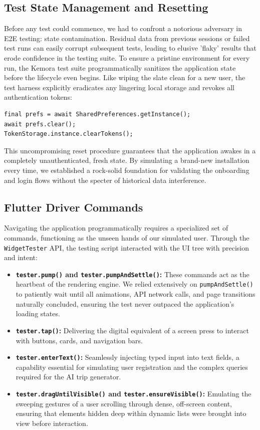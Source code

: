 \subsection{Test State Management and Resetting}
Before any test could commence, we had to confront a notorious adversary in E2E testing: state contamination. Residual data from previous sessions or failed test runs can easily corrupt subsequent tests, leading to elusive 'flaky' results that erode confidence in the testing suite. To ensure a pristine environment for every run, the Kemora test suite programmatically sanitizes the application state before the lifecycle even begins. Like wiping the slate clean for a new user, the test harness explicitly eradicates any lingering local storage and revokes all authentication tokens:
\begin{verbatim}
final prefs = await SharedPreferences.getInstance();
await prefs.clear();
TokenStorage.instance.clearTokens();
\end{verbatim}
This uncompromising reset procedure guarantees that the application awakes in a completely unauthenticated, fresh state. By simulating a brand-new installation every time, we established a rock-solid foundation for validating the onboarding and login flows without the specter of historical data interference.

\subsection{Flutter Driver Commands}
Navigating the application programmatically requires a specialized set of commands, functioning as the unseen hands of our simulated user. Through the \texttt{WidgetTester} API, the testing script interacted with the UI tree with precision and intent:
\begin{itemize}
    \item \textbf{\texttt{tester.pump()} and \texttt{tester.pumpAndSettle()}:} These commands act as the heartbeat of the rendering engine. We relied extensively on \texttt{pumpAndSettle()} to patiently wait until all animations, API network calls, and page transitions naturally concluded, ensuring the test never outpaced the application's loading states.
    \item \textbf{\texttt{tester.tap()}:} Delivering the digital equivalent of a screen press to interact with buttons, cards, and navigation bars.
    \item \textbf{\texttt{tester.enterText()}:} Seamlessly injecting typed input into text fields, a capability essential for simulating user registration and the complex queries required for the AI trip generator.
    \item \textbf{\texttt{tester.dragUntilVisible()} and \texttt{tester.ensureVisible()}:} Emulating the sweeping gestures of a user scrolling through dense, off-screen content, ensuring that elements hidden deep within dynamic lists were brought into view before interaction.
\end{itemize}

